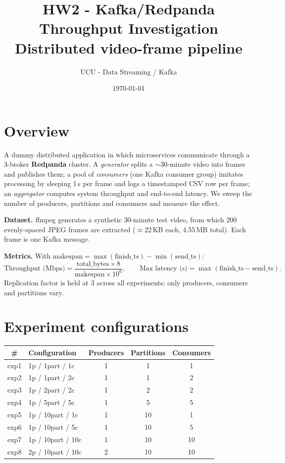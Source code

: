 \documentclass[11pt]{article}
\title{\vspace{-1.5em}HW2 - Kafka/Redpanda Throughput Investigation\\[0.3em]
\large Distributed video-frame pipeline}
\author{UCU - Data Streaming / Kafka}
\date{\today}
\begin{document}
\maketitle
\vspace{-1.5em}

\section{Overview}

A dummy distributed application in which microservices communicate through a
3-broker \textbf{Redpanda} cluster. A \emph{generator} splits a $\sim$30-minute video into
frames and publishes them; a pool of \emph{consumers} (one Kafka consumer group)
imitates processing by sleeping 1\,s per frame and logs a timestamped CSV row per
frame; an \emph{aggregator} computes system throughput and end-to-end latency. We
sweep the number of producers, partitions and consumers and measure the effect.

\textbf{Dataset.} ffmpeg generates a synthetic 30-minute test video, from which 200
evenly-spaced JPEG frames are extracted ($\approx$22\,KB each, 4.55\,MB total). Each
frame is one Kafka message.

\textbf{Metrics.} With $\text{makespan}=\max(\text{finish\_ts})-\min(\text{send\_ts})$:
\[
\text{Throughput (Mbps)}=\frac{\text{total\_bytes}\times 8}{\text{makespan}\times 10^{6}},
\qquad
\text{Max latency (s)}=\max(\text{finish\_ts}-\text{send\_ts}).
\]
Replication factor is held at 3 across all experiments; only producers, consumers
and partitions vary.

\section{Experiment configurations}

\begin{center}
\begin{tabular}{clccc}
\toprule
\# & Configuration & Producers & Partitions & Consumers \\
\midrule
exp1 & 1p / 1part / 1c   & 1 & 1  & 1  \\
exp2 & 1p / 1part / 2c   & 1 & 1  & 2  \\
exp3 & 1p / 2part / 2c   & 1 & 2  & 2  \\
exp4 & 1p / 5part / 5c   & 1 & 5  & 5  \\
exp5 & 1p / 10part / 1c  & 1 & 10 & 1  \\
exp6 & 1p / 10part / 5c  & 1 & 10 & 5  \\
exp7 & 1p / 10part / 10c & 1 & 10 & 10 \\
exp8 & 2p / 10part / 10c & 2 & 10 & 10 \\
\bottomrule
\end{tabular}
\end{center}
\end{document}
